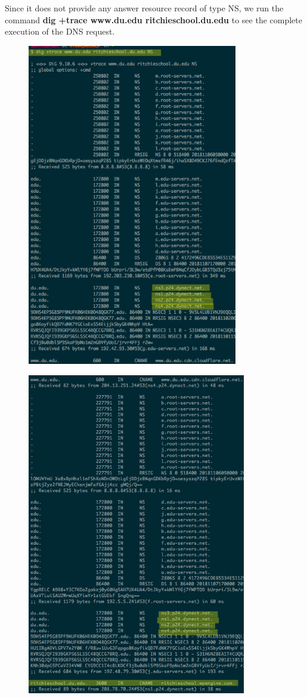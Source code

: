 \documentclass[]{report}
\begin{document}
Since it does not provide any answer resource record of type NS, we run the command \textbf{dig +trace www.du.edu ritchieschool.du.edu} to see the complete execution of the DNS request. 
\begin{figure}[H]
	\vspace{0pt}
	\includegraphics[height = 400pt, keepaspectratio]{Snapshots/q4/4_2_1.png}
\end{figure}

\begin{figure}[H]
	\vspace{0pt}
	\includegraphics[height = 400pt, keepaspectratio]{Snapshots/q4/4_2_2.png}
\end{figure}
\end{document}
